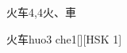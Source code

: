 \begin{entry}{火车}{4,4}{⽕、⾞}
  \begin{phonetics}{火车}{huo3 che1}[][HSK 1]
  \end{phonetics}
\end{entry}
